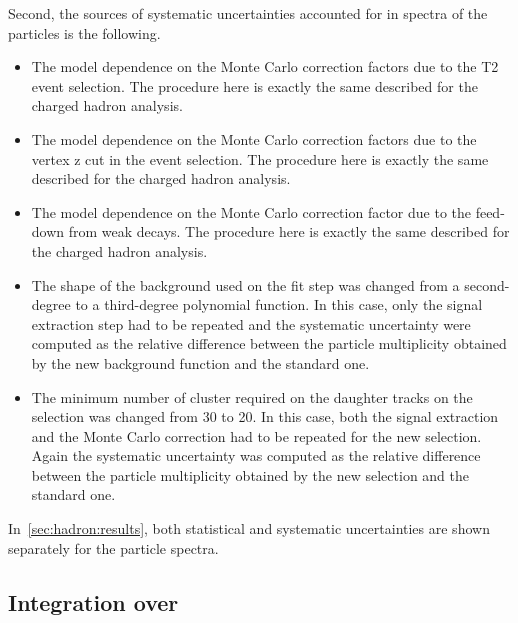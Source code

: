 Second, the sources of systematic uncertainties accounted for in
spectra of the \vzero particles is the following.
\begin{itemize}
  
\item The model dependence on the Monte Carlo correction factors due to
  the T2 event selection. The procedure here is exactly the same described
  for the charged hadron analysis.
  
\item The model dependence on the Monte Carlo correction factors due to
  the vertex z cut in the event selection.
  The procedure here is exactly the same described
  for the charged hadron analysis.
  
\item The model dependence on the Monte Carlo correction factor due to
  the feed-down from weak decays. The procedure here is exactly the same described
  for the charged hadron analysis.
  
\item The shape of the background used on the \minv fit step
  was changed from a second-degree to a third-degree polynomial
  function. In this case, only the signal extraction step had to be
  repeated and the systematic uncertainty were computed as the relative
  difference between the particle multiplicity obtained by the new
  background function and the standard one.

\item The minimum number of cluster required on the daughter tracks on the
  \vzero selection was changed from 30 to 20. In this case, both the signal
  extraction and the Monte Carlo correction had to be repeated for the new \vzero
  selection. Again the systematic uncertainty was computed as the relative
  difference between the particle multiplicity obtained by the new
  selection and the standard one.

\end{itemize}

In~\cref{sec:hadron:results}, both statistical and systematic uncertainties
are shown separately for the particle spectra.

\subsection{\boldmath Integration over \pT}
\label{sec:hadron:spec:int}


